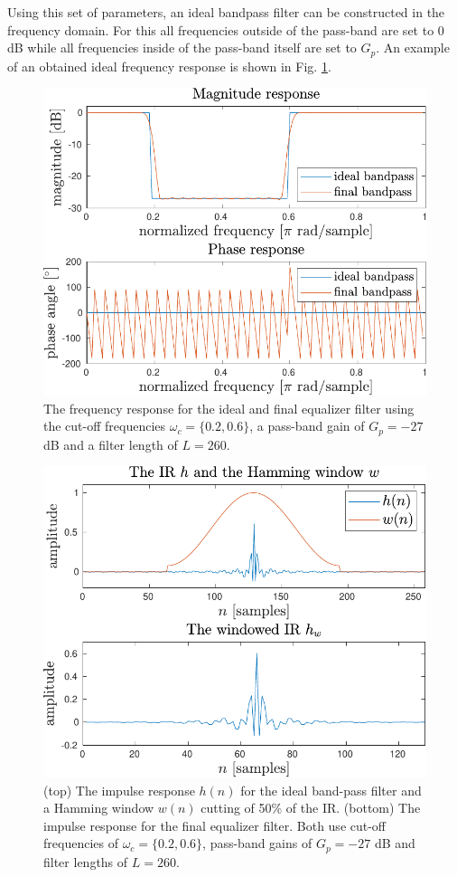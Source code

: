 \documentclass[journal]{IEEEtran}
\begin{document}
Using this set of parameters, an ideal bandpass filter can be constructed in the frequency domain. For this all frequencies outside of the pass-band are set to 0 dB while all frequencies inside of the pass-band itself are set to $G_p$. An example of an obtained ideal frequency response is shown in Fig. \ref{fig:eq}.

\begin{figure}
    \centering
    \includegraphics[width=\columnwidth]{assignment_02/plots/equalizer.pdf}
    \caption{The frequency response for the ideal and final equalizer filter using the cut-off frequencies $\omega_c=\{0.2,0.6\}$, a pass-band gain of $G_p=-27$ dB and a filter length of $L=260$.}
    \label{fig:eq}
\end{figure}
\begin{figure}
    \centering
    \includegraphics[width=\columnwidth]{assignment_02/plots/equalizer_ir.pdf}
    \caption{(top) The impulse response $h(n)$ for the ideal band-pass filter and a Hamming window $w(n)$ cutting of 50\% of the IR. (bottom) The impulse response for the final equalizer filter. Both use cut-off frequencies of $\omega_c=\{0.2,0.6\}$, pass-band gains of $G_p=-27$ dB and filter lengths of $L=260$.}
    \label{fig:eq_ir}
\end{figure}
\end{document}
